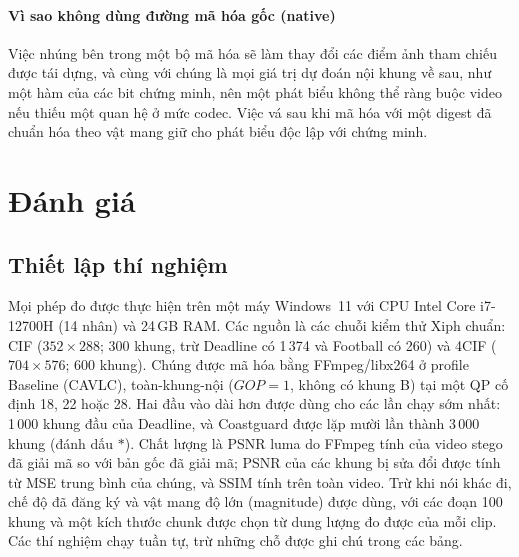 \documentclass[journal]{IEEEtran}
\begin{document}
\paragraph{Vì sao không dùng đường mã hóa gốc (native)} Việc nhúng bên trong một
bộ mã hóa sẽ làm thay đổi các điểm ảnh tham chiếu được tái dựng, và cùng với
chúng là mọi giá trị dự đoán nội khung về sau, như một hàm của các bit chứng
minh, nên một phát biểu không thể ràng buộc video nếu thiếu một quan hệ ở mức
codec. Việc vá sau khi mã hóa với một digest đã chuẩn hóa theo vật mang giữ cho
phát biểu độc lập với chứng minh.

\section{Đánh giá}
\label{sec:evaluation}

\subsection{Thiết lập thí nghiệm}
Mọi phép đo được thực hiện trên một máy Windows~11 với CPU Intel Core i7-12700H
(14 nhân) và 24\,GB RAM. Các nguồn là các chuỗi kiểm thử Xiph chuẩn: CIF
($352\times288$; 300 khung, trừ Deadline có 1\,374 và Football có 260) và 4CIF
($704\times576$; 600 khung). Chúng được mã hóa bằng FFmpeg/libx264 ở profile
Baseline (CAVLC), toàn-khung-nội ($\mathit{GOP}=1$, không có khung B) tại một QP
cố định 18, 22 hoặc 28. Hai đầu vào dài hơn được dùng cho các lần chạy sớm
nhất: 1\,000 khung đầu của Deadline, và Coastguard được lặp mười lần thành
3\,000 khung (đánh dấu $\ast$). Chất lượng là PSNR luma do FFmpeg tính của video
stego đã giải mã so với bản gốc đã giải mã; PSNR của các khung bị sửa đổi được
tính từ MSE trung bình của chúng, và SSIM tính trên toàn video. Trừ khi nói khác
đi, chế độ đã đăng ký và vật mang độ lớn (magnitude) được dùng, với các đoạn 100
khung và một kích thước chunk được chọn từ dung lượng đo được của mỗi clip. Các
thí nghiệm chạy tuần tự, trừ những chỗ được ghi chú trong các bảng.
\end{document}
